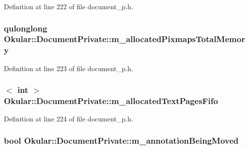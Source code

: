Definition at line 222 of file document\+\_\+p.\+h.

\hypertarget{classOkular_1_1DocumentPrivate_accbd72ead7fca72852b516f580d2abf1}{
\subsubsection[{m\+\_\+allocated\+Pixmaps\+Total\+Memory}]{\setlength{\rightskip}{0pt plus 5cm}qulonglong Okular\+::\+Document\+Private\+::m\+\_\+allocated\+Pixmaps\+Total\+Memory}}\label{classOkular_1_1DocumentPrivate_accbd72ead7fca72852b516f580d2abf1}


Definition at line 223 of file document\+\_\+p.\+h.

\hypertarget{classOkular_1_1DocumentPrivate_a2fb5e844b3870b8cff42a4c3b4bdfd48}{
\subsubsection[{m\+\_\+allocated\+Text\+Pages\+Fifo}]{$<$ int $>$ Okular\+::\+Document\+Private\+::m\+\_\+allocated\+Text\+Pages\+Fifo}}\label{classOkular_1_1DocumentPrivate_a2fb5e844b3870b8cff42a4c3b4bdfd48}


Definition at line 224 of file document\+\_\+p.\+h.

\hypertarget{classOkular_1_1DocumentPrivate_a57c1dee8543960398669cb927fab17cc}{
\subsubsection[{m\+\_\+annotation\+Being\+Moved}]{\setlength{\rightskip}{0pt plus 5cm}bool Okular\+::\+Document\+Private\+::m\+\_\+annotation\+Being\+Moved}}\label{classOkular_1_1DocumentPrivate_a57c1dee8543960398669cb927fab17cc}


